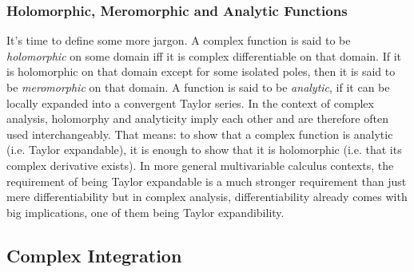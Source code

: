 \subsubsection{Holomorphic, Meromorphic and Analytic Functions}
It's time to define some more jargon. A complex function is said to be \emph{holomorphic} on some domain iff it is complex differentiable on that domain. If it is holomorphic on that domain except for some isolated poles, then it is said to be \emph{meromorphic} on that domain. A function is said to be \emph{analytic}, if it can be locally expanded into a convergent Taylor series. In the context of complex analysis, holomorphy and analyticity imply each other and are therefore often used interchangeably. That means: to show that a complex function is analytic (i.e. Taylor expandable), it is enough to show that it is holomorphic (i.e. that its complex derivative exists). In more general multivariable calculus contexts, the requirement of being Taylor expandable is a much stronger requirement than just mere differentiability but in complex analysis, differentiability already comes with big implications, one of them being Taylor expandibility.









\subsection{Complex Integration}


